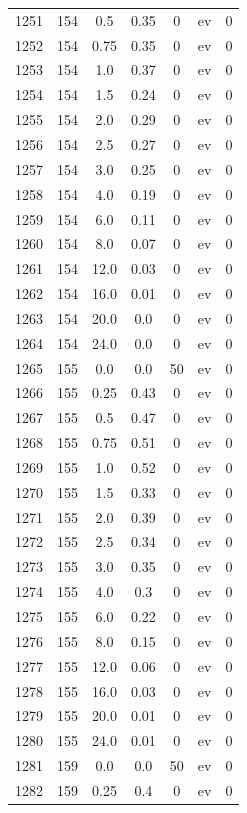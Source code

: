 \documentclass[12pt,a4paper]{article}
\begin{document}
\begin{tabular}{r|cccccc}
	1251 & 154 & 0.5 & 0.35 & 0 & ev & 0 \\
	1252 & 154 & 0.75 & 0.35 & 0 & ev & 0 \\
	1253 & 154 & 1.0 & 0.37 & 0 & ev & 0 \\
	1254 & 154 & 1.5 & 0.24 & 0 & ev & 0 \\
	1255 & 154 & 2.0 & 0.29 & 0 & ev & 0 \\
	1256 & 154 & 2.5 & 0.27 & 0 & ev & 0 \\
	1257 & 154 & 3.0 & 0.25 & 0 & ev & 0 \\
	1258 & 154 & 4.0 & 0.19 & 0 & ev & 0 \\
	1259 & 154 & 6.0 & 0.11 & 0 & ev & 0 \\
	1260 & 154 & 8.0 & 0.07 & 0 & ev & 0 \\
	1261 & 154 & 12.0 & 0.03 & 0 & ev & 0 \\
	1262 & 154 & 16.0 & 0.01 & 0 & ev & 0 \\
	1263 & 154 & 20.0 & 0.0 & 0 & ev & 0 \\
	1264 & 154 & 24.0 & 0.0 & 0 & ev & 0 \\
	1265 & 155 & 0.0 & 0.0 & 50 & ev & 0 \\
	1266 & 155 & 0.25 & 0.43 & 0 & ev & 0 \\
	1267 & 155 & 0.5 & 0.47 & 0 & ev & 0 \\
	1268 & 155 & 0.75 & 0.51 & 0 & ev & 0 \\
	1269 & 155 & 1.0 & 0.52 & 0 & ev & 0 \\
	1270 & 155 & 1.5 & 0.33 & 0 & ev & 0 \\
	1271 & 155 & 2.0 & 0.39 & 0 & ev & 0 \\
	1272 & 155 & 2.5 & 0.34 & 0 & ev & 0 \\
	1273 & 155 & 3.0 & 0.35 & 0 & ev & 0 \\
	1274 & 155 & 4.0 & 0.3 & 0 & ev & 0 \\
	1275 & 155 & 6.0 & 0.22 & 0 & ev & 0 \\
	1276 & 155 & 8.0 & 0.15 & 0 & ev & 0 \\
	1277 & 155 & 12.0 & 0.06 & 0 & ev & 0 \\
	1278 & 155 & 16.0 & 0.03 & 0 & ev & 0 \\
	1279 & 155 & 20.0 & 0.01 & 0 & ev & 0 \\
	1280 & 155 & 24.0 & 0.01 & 0 & ev & 0 \\
	1281 & 159 & 0.0 & 0.0 & 50 & ev & 0 \\
	1282 & 159 & 0.25 & 0.4 & 0 & ev & 0 \\

\end{tabular}
\end{document}
